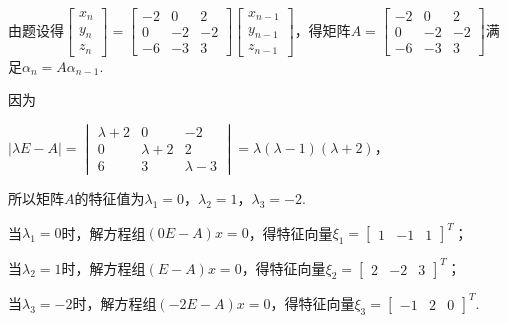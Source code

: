 \begin{solution}
    由题设得$\begin{bmatrix}x_n\\y_n\\z_n\end{bmatrix}=\begin{bmatrix}-2&0&2\\0&-2&-2\\-6&-3&3\end{bmatrix}\begin{bmatrix}x_{n-1}\\y_{n-1}\\z_{n-1}\end{bmatrix}$，得矩阵$A=\begin{bmatrix}-2&0&2\\0&-2&-2\\-6&-3&3\end{bmatrix}$满足$\alpha_n=A\alpha_{n-1}$.

    因为

    $|\lambda E-A|=\begin{vmatrix}\lambda+2&0&-2\\0&\lambda+2&2\\6&3&\lambda-3\end{vmatrix}=\lambda(\lambda-1)(\lambda+2)$，

    所以矩阵$A$的特征值为$\lambda_1=0$，$\lambda_2=1$，$\lambda_3=-2$.

    当$\lambda_1=0$时，解方程组$(0E-A)x=0$，得特征向量$\xi_1=\begin{bmatrix}1&-1&1\end{bmatrix}^{T}$；

    当$\lambda_2=1$时，解方程组$(E-A)x=0$，得特征向量$\xi_2=\begin{bmatrix}2&-2&3\end{bmatrix}^{T}$；

    当$\lambda_3=-2$时，解方程组$(-2E-A)x=0$，得特征向量$\xi_3=\begin{bmatrix}-1&2&0\end{bmatrix}^T$.


\end{solution}
